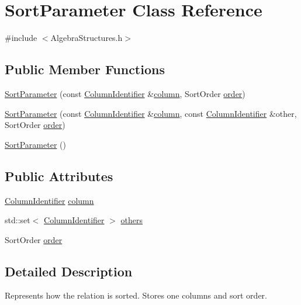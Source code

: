 \hypertarget{class_sort_parameter}{\section{Sort\+Parameter Class Reference}
\label{class_sort_parameter}
}


{\ttfamily \#include $<$Algebra\+Structures.\+h$>$}

\subsection*{Public Member Functions}
\begin{DoxyCompactItemize}
\item 
\hyperlink{class_sort_parameter_aef62c54532ba4260cdc41dfe6157db6b}{Sort\+Parameter} (const \hyperlink{class_column_identifier}{Column\+Identifier} \&\hyperlink{class_sort_parameter_a663fa509158e2230256acb4cee4657b9}{column}, Sort\+Order \hyperlink{class_sort_parameter_a768e8eeb0a9857820c1596ed50c0c13a}{order})
\item 
\hyperlink{class_sort_parameter_ae50120282e94b4918e1cf33dc1b9cc50}{Sort\+Parameter} (const \hyperlink{class_column_identifier}{Column\+Identifier} \&\hyperlink{class_sort_parameter_a663fa509158e2230256acb4cee4657b9}{column}, const \hyperlink{class_column_identifier}{Column\+Identifier} \&other, Sort\+Order \hyperlink{class_sort_parameter_a768e8eeb0a9857820c1596ed50c0c13a}{order})
\item 
\hyperlink{class_sort_parameter_a059b71791c331f735f453ce67ae2af23}{Sort\+Parameter} ()
\end{DoxyCompactItemize}
\subsection*{Public Attributes}
\begin{DoxyCompactItemize}
\item 
\hyperlink{class_column_identifier}{Column\+Identifier} \hyperlink{class_sort_parameter_a663fa509158e2230256acb4cee4657b9}{column}
\item 
std\+::set$<$ \hyperlink{class_column_identifier}{Column\+Identifier} $>$ \hyperlink{class_sort_parameter_ad898e5ea54ea4599db663b480af94cfd}{others}
\item 
Sort\+Order \hyperlink{class_sort_parameter_a768e8eeb0a9857820c1596ed50c0c13a}{order}
\end{DoxyCompactItemize}


\subsection{Detailed Description}
Represents how the relation is sorted. Stores one columns and sort order. 

